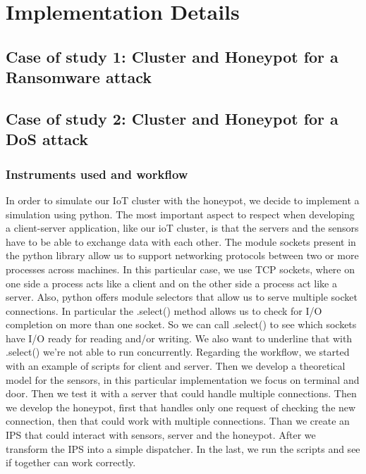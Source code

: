 \chapter{Implementation Details}
\section{Case of study 1: Cluster and Honeypot for a Ransomware attack}
\section{Case of study 2: Cluster and Honeypot for a DoS attack}
\subsection{Instruments used and workflow}
In order to simulate our IoT cluster with the honeypot, we decide to implement a simulation using python. The most important aspect 
to respect when developing a client-server application, like our ioT cluster, is that the servers and the sensors have to be able to exchange data 
with each other. The module sockets present in the python library allow us to support networking protocols between two or more processes across machines. 
In this particular case, we use TCP sockets, where on one side a process acts like a client and on the other side a process act like a server.
 Also, python offers module selectors that allow us to serve multiple socket connections. In particular the .select() method allows us to check for I/O completion on more than one socket. So we can call .select() to see which sockets have I/O
 ready for reading and/or writing.  We also want to underline that with .select()  we’re not able to run concurrently. 
Regarding the workflow, we started with an example of scripts for client and server. Then we develop a theoretical model for the sensors, in this particular 
implementation we focus on terminal and door. Then we test it with a server that could handle multiple connections. Then we develop the honeypot, first that handles only 
one request of checking the new connection, then that could work with multiple connections. Than we create an IPS that could interact with sensors, server and the honeypot. 
After we transform the IPS into a simple dispatcher. In the last, we run the scripts and see if together can work correctly.  
